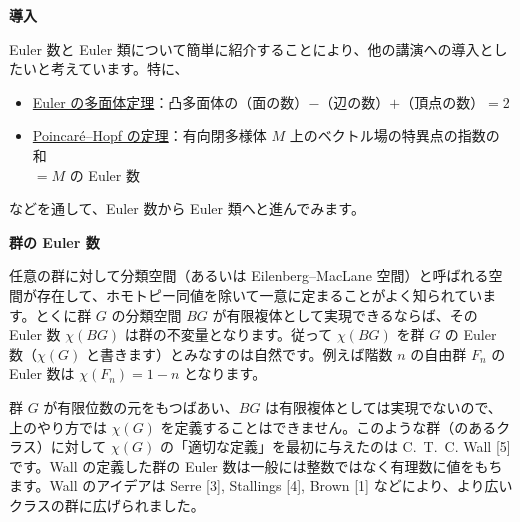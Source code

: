 \documentclass[uplatex,dvipdfmx]{jlreq}
\begin{document}
\begin{center}
{\large\bfseries 導入}\\[6pt]
\hspace*{\fill}{\large\bfseries 佐藤　肇（名古屋大学・名誉教授）}
\end{center}

Euler 数と Euler 類について簡単に紹介することにより、他の講演への導入としたいと考えています。特に、
\begin{itemize}
  \item[] \underline{Euler の多面体定理}：凸多面体の（面の数）$-$（辺の数）$+$（頂点の数）$= 2$
  \item[] \underline{Poincaré--Hopf の定理}：有向閉多様体 $M$ 上のベクトル場の特異点の指数の和\\
  \hspace*{\fill} $= M$ の Euler 数
\end{itemize}
などを通して、Euler 数から Euler 類へと進んでみます。

\newpage

\begin{center}
{\large\bfseries 群の Euler 数}\\[6pt]
\hspace*{\fill}{\large\bfseries 秋田　利之}
\end{center}

任意の群に対して分類空間（あるいは Eilenberg--MacLane 空間）と呼ばれる空間が存在して、ホモトピー同値を除いて一意に定まることがよく知られています。とくに群 $G$ の分類空間 $BG$ が有限複体として実現できるならば、その Euler 数 $\chi(BG)$ は群の不変量となります。従って $\chi(BG)$ を群 $G$ の Euler 数（$\chi(G)$ と書きます）とみなすのは自然です。例えば階数 $n$ の自由群 $F_n$ の Euler 数は $\chi(F_n)=1-n$ となります。

群 $G$ が有限位数の元をもつばあい、$BG$ は有限複体としては実現でないので、上のやり方では $\chi(G)$ を定義することはできません。このような群（のあるクラス）に対して $\chi(G)$ の「適切な定義」を最初に与えたのは C.~T.~C. Wall [5] です。Wall の定義した群の Euler 数は一般には整数ではなく有理数に値をもちます。Wall のアイデアは Serre [3], Stallings [4], Brown [1] などにより、より広いクラスの群に広げられました。
\end{document}
